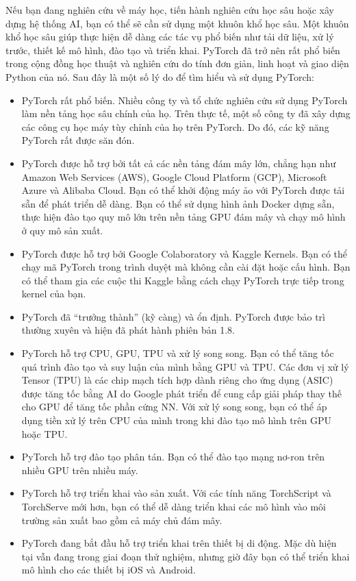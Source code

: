 \documentclass[../main.tex]{subfiles}
\begin{document}
Nếu bạn đang nghiên cứu về máy học, tiến hành nghiên cứu học sâu hoặc xây dựng hệ thống AI, bạn có thể sẽ cần sử dụng một khuôn khổ học sâu. Một khuôn khổ học sâu giúp thực hiện dễ dàng các tác vụ phổ biến như tải dữ liệu, xử lý trước, thiết kế mô hình, đào tạo và triển khai. PyTorch đã trở nên rất phổ biến trong cộng đồng học thuật và nghiên cứu do tính đơn giản, linh hoạt và giao diện Python của nó. Sau đây là một số lý do để tìm hiểu và sử dụng PyTorch:
\begin{itemize}
    \item PyTorch rất phổ biến. Nhiều công ty và tổ chức nghiên cứu sử dụng PyTorch làm nền tảng học sâu chính của họ. Trên thực tế, một số công ty đã xây dựng các công cụ học máy tùy chỉnh của họ trên PyTorch. Do đó, các kỹ năng PyTorch rất được săn đón.
    \item PyTorch được hỗ trợ bởi tất cả các nền tảng đám mây lớn, chẳng hạn như Amazon Web Services (AWS), Google Cloud Platform (GCP), Microsoft Azure và Alibaba Cloud. Bạn có thể khởi động máy ảo với PyTorch được tải sẵn để phát triển dễ dàng. Bạn có thể sử dụng hình ảnh Docker dựng sẵn, thực hiện đào tạo quy mô lớn trên nền tảng GPU đám mây và chạy mô hình ở quy mô sản xuất.
    \item PyTorch được hỗ trợ bởi Google Colaboratory và Kaggle Kernels. Bạn có thể chạy mã PyTorch trong trình duyệt mà không cần cài đặt hoặc cấu hình. Bạn có thể tham gia các cuộc thi Kaggle bằng cách chạy PyTorch trực tiếp trong kernel của bạn.
    \item PyTorch đã ``trưởng thành'' (kỹ càng) và ổn định. PyTorch được bảo trì thường xuyên và hiện đã phát hành phiên bản 1.8.
    \item PyTorch hỗ trợ CPU, GPU, TPU và xử lý song song. Bạn có thể tăng tốc quá trình đào tạo và suy luận của mình bằng GPU và TPU. Các đơn vị xử lý Tensor (TPU) là các chip mạch tích hợp dành riêng cho ứng dụng (ASIC) được tăng tốc bằng AI do Google phát triển để cung cấp giải pháp thay thế cho GPU để tăng tốc phần cứng NN. Với xử lý song song, bạn có thể áp dụng tiền xử lý trên CPU của mình trong khi đào tạo mô hình trên GPU hoặc TPU.
    \item PyTorch hỗ trợ đào tạo phân tán. Bạn có thể đào tạo mạng nơ-ron trên nhiều GPU trên nhiều máy.
    \item PyTorch hỗ trợ triển khai vào sản xuất. Với các tính năng TorchScript và TorchServe mới hơn, bạn có thể dễ dàng triển khai các mô hình vào môi trường sản xuất bao gồm cả máy chủ đám mây.
    \item PyTorch đang bắt đầu hỗ trợ triển khai trên thiết bị di động. Mặc dù hiện tại vẫn đang trong giai đoạn thử nghiệm, nhưng giờ đây bạn có thể triển khai mô hình cho các thiết bị iOS và Android.

\end{itemize}
\end{document}
